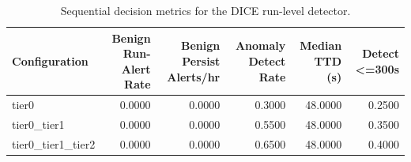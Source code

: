 \begin{table}[t]
\centering
\caption{Sequential decision metrics for the DICE run-level detector.}
\label{tab:dice_sequential_metrics}
\footnotesize
\begin{tabular}{lrrrrr}
\toprule
Configuration & Benign Run-Alert Rate & Benign Persist Alerts/hr & Anomaly Detect Rate & Median TTD (s) & Detect <=300s \\
\midrule
tier0 & 0.0000 & 0.0000 & 0.3000 & 48.0000 & 0.2500 \\
tier0_tier1 & 0.0000 & 0.0000 & 0.5500 & 48.0000 & 0.3500 \\
tier0_tier1_tier2 & 0.0000 & 0.0000 & 0.6500 & 48.0000 & 0.4000 \\
\bottomrule
\end{tabular}

\end{table}
